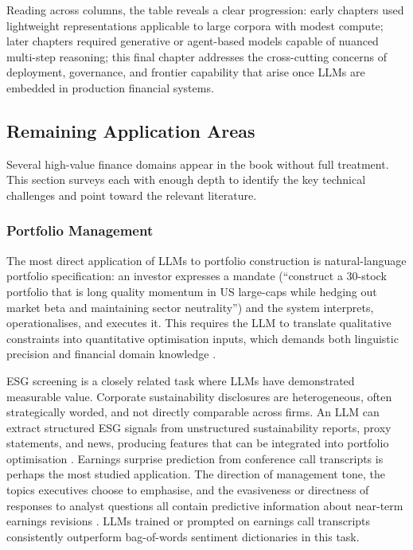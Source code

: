 \begin{context}

Reading across columns, the table reveals a clear progression: early chapters used lightweight representations applicable to large corpora with modest compute; later chapters required generative or agent-based models capable of nuanced multi-step reasoning; this final chapter addresses the cross-cutting concerns of deployment, governance, and frontier capability that arise once LLMs are embedded in production financial systems.

\subsection{Remaining Application Areas}
\label{subsec:af-survey-areas}

Several high-value finance domains appear in the book without full treatment. This section surveys each with enough depth to identify the key technical challenges and point toward the relevant literature.

\subsubsection*{Portfolio Management}
The most direct application of LLMs to portfolio construction is natural-language portfolio specification: an investor expresses a mandate (``construct a 30-stock portfolio that is long quality momentum in US large-caps while hedging out market beta and maintaining sector neutrality'') and the system interprets, operationalises, and executes it. This requires the LLM to translate qualitative constraints into quantitative optimisation inputs, which demands both linguistic precision and financial domain knowledge \cite{lopezdeprado2018advances}.

ESG screening is a closely related task where LLMs have demonstrated measurable value. Corporate sustainability disclosures are heterogeneous, often strategically worded, and not directly comparable across firms. An LLM can extract structured ESG signals from unstructured sustainability reports, proxy statements, and news, producing features that can be integrated into portfolio optimisation \cite{kolbel2020esg}.
Earnings surprise prediction from conference call transcripts is perhaps the most studied application. The direction of management tone, the topics executives choose to emphasise, and the evasiveness or directness of responses to analyst questions all contain predictive information about near-term earnings revisions \cite{LopezLiraTang2023}. LLMs trained or prompted on earnings call transcripts consistently outperform bag-of-words sentiment dictionaries in this task.


\end{context}
